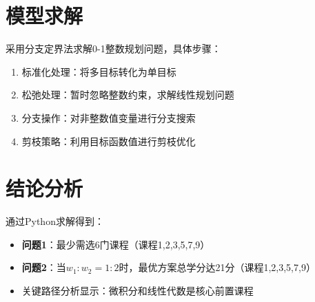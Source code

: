 \section{模型求解}
采用分支定界法求解0-1整数规划问题，具体步骤：
\begin{enumerate}
\item 标准化处理：将多目标转化为单目标
\item 松弛处理：暂时忽略整数约束，求解线性规划问题
\item 分支操作：对非整数值变量进行分支搜索
\item 剪枝策略：利用目标函数值进行剪枝优化
\end{enumerate}

\section{结论分析}
通过Python求解得到：
\begin{itemize}
\item \textbf{问题1}：最少需选6门课程（课程1,2,3,5,7,9）
\item \textbf{问题2}：当$w_1:w_2=1:2$时，最优方案总学分达21分（课程1,2,3,5,7,9）
\item 关键路径分析显示：微积分和线性代数是核心前置课程
\end{itemize}
